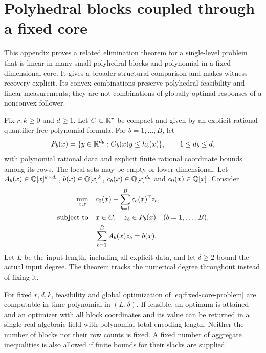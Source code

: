 \section{Polyhedral blocks coupled through a fixed core}\label{app:fixed-core}

This appendix proves a related elimination theorem for a single-level
problem that is linear in many small polyhedral blocks and polynomial in
a fixed-dimensional core. It gives a broader structural comparison and
makes witness recovery explicit. Its convex combinations preserve
polyhedral feasibility and linear measurements; they are not combinations
of globally optimal responses of a nonconvex follower.

Fix $r,k\ge0$ and $d\ge1$. Let $C\subset\mathbb R^r$ be compact and given by an explicit
rational quantifier-free polynomial formula. For $b=1,\ldots,B$, let
\[
 P_b(x)=\{y\in\mathbb R^{d_b}:G_b(x)y\le h_b(x)\},\qquad 1\le d_b\le d,
\]
with polynomial rational data and explicit finite rational coordinate
bounds among its rows. The local sets may be empty or lower-dimensional.
Let $A_b(x)\in\mathbb Q[x]^{k\times d_b}$, $b(x)\in\mathbb Q[x]^k$,
$c_b(x)\in\mathbb Q[x]^{d_b}$ and $c_0(x)\in\mathbb Q[x]$. Consider
\begin{equation}\label{eq:fixed-core-problem}
 \begin{aligned}
 \min_{x,z}\quad&c_0(x)+\sum_{b=1}^B c_b(x)^{\mathsf T} z_b,\\
 \text{subject to}\quad&x\in C,\quad z_b\in P_b(x)\quad(b=1,\ldots,B),\\
 &\sum_{b=1}^B A_b(x)z_b=b(x).
 \end{aligned}
\end{equation}
Let $L$ be the input length, including all explicit data, and let
$\delta\ge2$ bound the actual input degree. The theorem tracks the
numerical degree throughout instead of fixing it.

\begin{theorem}\label{thm:fixed-core}
For fixed $r,d,k$, feasibility and global optimization of
\eqref{eq:fixed-core-problem} are computable in time polynomial in
$(L,\delta)$. If feasible, an optimum is attained and an optimizer with
all block coordinates and its value can be returned in a single
real-algebraic field with polynomial total encoding length. Neither the
number of blocks nor their row counts is fixed. A fixed number of
aggregate inequalities is also allowed if finite bounds for their
slacks are supplied.
\end{theorem}

